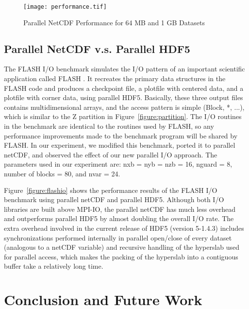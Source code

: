 \documentclass[10pt,twocolumn]{article}          %
\begin{document}
\begin{figure*}
\begin{center}
\texttt{[image: performance.tif]}
\end{center}
\vskip -0.1in \caption{Parallel NetCDF Performance for 64 MB and
1 GB Datasets} \label{figure:m64g1}
\end{figure*}

\subsection{Parallel NetCDF v.s. Parallel HDF5}

The FLASH I/O benchmark simulates the I/O pattern of an important
scientific application called FLASH \cite{FORT00}. It recreates
the primary data structures in the FLASH code and produces a
checkpoint file, a plotfile with centered data, and a plotfile
with corner data, using parallel HDF5. Basically, these three
output files contains multidimensional arrays, and the access
pattern is simple (Block, *, ...), which is similar to the Z partition
in Figure~\ref{figure:partition}. The I/O routines in the
benchmark are identical to the routines used by FLASH, so any
performance improvements made to the benchmark program will be
shared by FLASH. In our experiment, we modified this benchmark,
ported it to parallel netCDF, and observed the 
effect of our new parallel I/O approach. The parameters used in
our experiment are: nxb = nyb = nzb = 16, nguard = 8, number of
blocks = 80, and nvar = 24.

Figure~\ref{figure:flashio} shows the performance results of the FLASH
I/O benchmark using parallel netCDF and parallel HDF5. Although
both I/O libraries are built above MPI-IO, the
parallel netCDF has much less overhead and outperforms parallel
HDF5 by almost doubling the overall I/O rate. The extra overhead
involved in the current release of HDF5 (version 5-1.4.3) includes
synchronizations performed internally in parallel open/close of
every dataset (analogous to a netCDF variable) and recursive handling
of the hyperslab used for parallel access, which makes the packing of
the hyperslab into a contiguous buffer take a relatively long time.


\section{Conclusion and Future Work}
\end{document}
